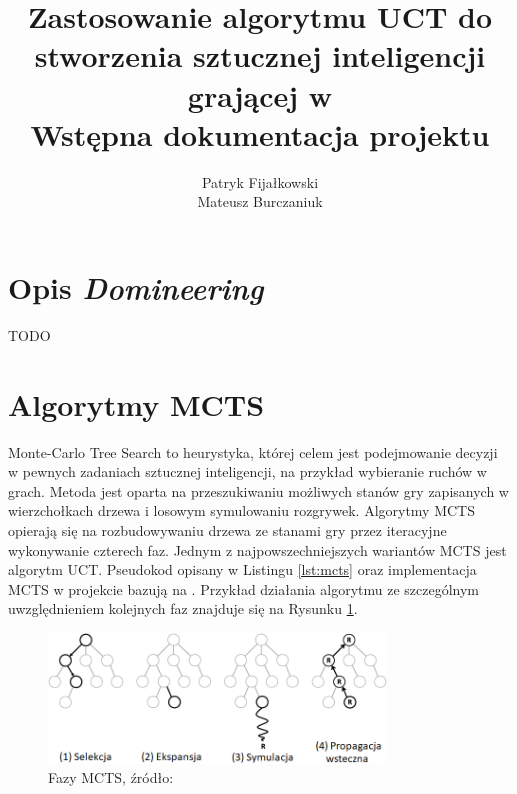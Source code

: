 \documentclass[a4paper,12pt]{article}
\title{
	Zastosowanie algorytmu UCT do stworzenia sztucznej inteligencji grającej w \nazwagry\\
	\large Wstępna dokumentacja projektu}
\author{Patryk Fijałkowski \\ Mateusz Burczaniuk}
\let\oldsection\section
\renewcommand\section{\clearpage\oldsection}
\newcommand{\nazwagry}{\textit{Domineering}}
\begin{document}
\begin{titlingpage}
	\maketitle
	\vspace{3cm}
\end{titlingpage}


\section{Opis \nazwagry}
TODO

\section{Algorytmy MCTS}
Monte-Carlo Tree Search to heurystyka, której celem jest podejmowanie decyzji w pewnych zadaniach sztucznej inteligencji, na przykład wybieranie ruchów w grach. Metoda jest oparta na przeszukiwaniu możliwych stanów gry zapisanych w wierzchołkach drzewa i losowym symulowaniu rozgrywek. Algorytmy MCTS opierają się na rozbudowywaniu drzewa ze stanami gry przez iteracyjne wykonywanie czterech faz. Jednym z najpowszechniejszych wariantów MCTS jest algorytm UCT. Pseudokod opisany w Listingu \ref{lst:mcts} oraz implementacja MCTS w projekcie bazują na \cite{banditbased}. Przykład działania algorytmu ze szczególnym uwzględnieniem kolejnych faz znajduje się na Rysunku \ref{rys:mcts_phases}.

\begin{figure}[h]
	\centering
	\includegraphics[width=0.8\textwidth]{mcts_phases_pl.png}
	\caption{Fazy MCTS, źródło: \cite{mctsanalysis}}
	\label{rys:mcts_phases}
\end{figure}
\end{document}
